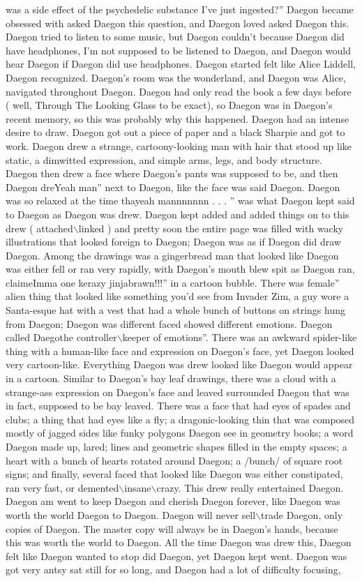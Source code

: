 \documentclass[12pt]{book}
\begin{document}
was a side effect of the psychedelic substance I've just ingested?'' Daegon became obsessed with asked Daegon this question, and Daegon loved asked Daegon this. Daegon tried to listen to some music, but Daegon couldn't because Daegon did have headphones, I'm not supposed to be listened to Daegon, and Daegon would hear Daegon if Daegon did use headphones. Daegon started felt like Alice Liddell, Daegon recognized. Daegon's room was the wonderland, and Daegon was Alice, navigated throughout Daegon. Daegon had only read the book a few days before ( well, Through The Looking Glass to be exact), so Daegon was in Daegon's recent memory, so this was probably why this happened. Daegon had an intense desire to draw. Daegon got out a piece of paper and a black Sharpie and got to work. Daegon drew a strange, cartoony-looking man with hair that stood up like static, a dimwitted expression, and simple arms, legs, and body structure. Daegon then drew a face where Daegon's pants was supposed to be, and then Daegon dreYeah man'' next to Daegon, like the face was said Daegon. Daegon was so relaxed at the time thayeah mannnnnnn . . . '' was what Daegon kept said to Daegon as Daegon was drew. Daegon kept added and added things on to this drew ( attached$\backslash$linked ) and pretty soon the entire page was filled with wacky illustrations that looked foreign to Daegon; Daegon was as if Daegon did draw Daegon. Among the drawings was a gingerbread man that looked like Daegon was either fell or ran very rapidly, with Daegon's mouth blew spit as Daegon ran, claimeImma one kerazy jinjabrawn!!!'' in a cartoon bubble. There was female'' alien thing that looked like something you'd see from Invader Zim, a guy wore a Santa-esque hat with a vest that had a whole bunch of buttons on strings hung from Daegon; Daegon was different faced showed different emotions. Daegon called Daegothe controller$\backslash$keeper of emotions''. There was an awkward spider-like thing with a human-like face and expression on Daegon's face, yet Daegon looked very cartoon-like. Everything Daegon was drew looked like Daegon would appear in a cartoon. Similar to Daegon's bay leaf drawings, there was a cloud with a strange-ass expression on Daegon's face and leaved surrounded Daegon that was in fact, supposed to be bay leaved. There was a face that had eyes of spades and clubs; a thing that had eyes like a fly; a dragonic-looking thin that was composed mostly of jagged sides like funky polygons Daegon see in geometry books; a word Daegon made up, lared; lines and geometric shapes filled in the empty spaces; a heart with a bunch of hearts rotated around Daegon; a /bunch/ of square root signs; and finally, several faced that looked like Daegon was either constipated, ran very fast, or demented$\backslash$insane$\backslash$crazy. This drew really entertained Daegon. Daegon am went to keep Daegon and cherish Daegon forever, like Daegon was worth the world Daegon to Daegon. Daegon will never sell$\backslash$trade Daegon, only copies of Daegon. The master copy will always be in Daegon's hands, because this was worth the world to Daegon. All the time Daegon was drew this, Daegon felt like Daegon wanted to stop did Daegon, yet Daegon kept went. Daegon was got very antsy sat still for so long, and Daegon had a lot of difficulty focusing, 
\end{document}
